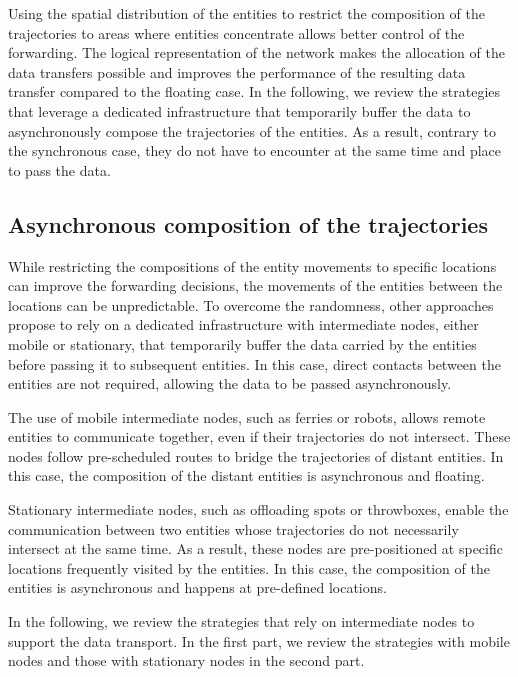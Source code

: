 Using the spatial distribution of the entities to restrict the composition of the trajectories to areas where entities concentrate allows better control of the forwarding. The logical representation of the network makes the allocation of the data transfers possible and improves the performance of the resulting data transfer compared to the floating case. In the following, we review the strategies that leverage a dedicated infrastructure that temporarily buffer the data to asynchronously compose the trajectories of the entities. As a result, contrary to the synchronous case, they do not have to encounter at the same time and place to pass the data.


\subsection{Asynchronous composition of the trajectories}
\label{sec:indirect-async}

While restricting the compositions of the entity movements to specific locations can improve the forwarding decisions, the movements of the entities between the locations can be unpredictable. To overcome the randomness, other approaches propose to rely on a dedicated infrastructure with intermediate nodes, either mobile or stationary, that temporarily buffer the data carried by the entities before passing it to subsequent entities. In this case, direct contacts between the entities are not required, allowing the data to be passed asynchronously. 

The use of mobile intermediate nodes, such as ferries or robots, allows remote entities to communicate together, even if their trajectories do not intersect. These nodes follow pre-scheduled routes to bridge the trajectories of distant entities. In this case, the composition of the distant entities is asynchronous and floating.

Stationary intermediate nodes, such as offloading spots or throwboxes, enable the communication between two entities whose trajectories do not necessarily intersect at the same time. As a result, these nodes are pre-positioned at specific locations frequently visited by the entities. In this case, the composition of the entities is asynchronous and happens at pre-defined locations.

In the following, we review the strategies that rely on intermediate nodes to support the data transport. In the first part, we review the strategies with mobile nodes and those with stationary nodes in the second part.

